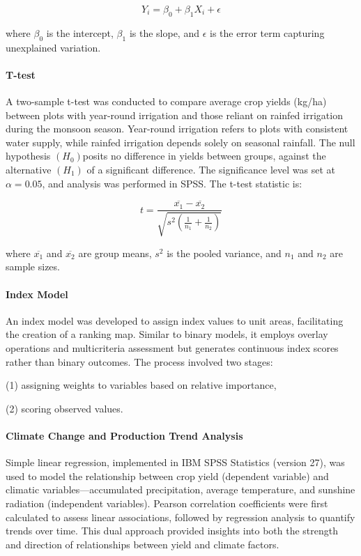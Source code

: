 \[
Y_i = \beta_0 + \beta_1 X_i + \epsilon
\]

where $\beta_0$ is the intercept, $\beta_1$ is the slope, and $\epsilon$ is the error term capturing unexplained variation.

\paragraph{T-test}
A two-sample t-test was conducted to compare average crop yields (kg/ha) between plots with year-round irrigation and those reliant on rainfed irrigation during the monsoon season. Year-round irrigation refers to plots with consistent water supply, while rainfed irrigation depends solely on seasonal rainfall. The null hypothesis $(H_0) $posits no difference in yields between groups, against the alternative $(H_1)$ of a significant difference. The significance level was set at $\alpha = 0.05$, and analysis was performed in SPSS.
The t-test statistic is:

\[
t = \frac{\overline{x_1} - \overline{x_2}}{\sqrt{s^2 \left( \frac{1}{n_1} + \frac{1}{n_2} \right)}}
\]

where $\overline{x_1}$ and $\overline{x_2}$ are group means, $s^2$ is the pooled variance, and $n_1$ and $n_2$ are sample sizes.

\paragraph{Index Model}  
An index model was developed to assign index values to unit areas, facilitating the creation of a ranking map. Similar to binary models, it employs overlay operations and multicriteria assessment but generates continuous index scores rather than binary outcomes.
The process involved two stages:

(1) assigning weights to variables based on relative importance, 

(2) scoring observed values.

\paragraph{Climate Change and Production Trend Analysis}  
Simple linear regression, implemented in IBM SPSS Statistics (version 27), was used to model the relationship between crop yield (dependent variable) and climatic variables---accumulated precipitation, average temperature, and sunshine radiation (independent variables). Pearson correlation coefficients were first calculated to assess linear associations, followed by regression analysis to quantify trends over time. This dual approach provided insights into both the strength and direction of relationships between yield and climate factors.

